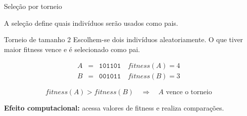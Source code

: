 \documentclass[aspectratio=169,11pt]{beamer}
\newcommand{\bits}[1]{\texttt{#1}}
\begin{document}
\begin{frame}{Seleção por torneio}

    \vspace{0.10cm}

    A seleção define quais indivíduos serão usados como pais.

    \vspace{0.20cm}

    \begin{questionbox}{Torneio de tamanho 2}
        Escolhem-se dois indivíduos aleatoriamente. O que tiver maior fitness
        vence e é selecionado como pai.
    \end{questionbox}

    \vspace{0.25cm}

    \[
        \begin{array}{rcl}
        A &=& \bits{101101} \quad fitness(A)=4 \\
        B &=& \bits{001011} \quad fitness(B)=3
        \end{array}
    \]

    \vspace{0.10cm}

    \[
        fitness(A) > fitness(B) \quad \Rightarrow \quad A \text{ vence o torneio}
    \]

    \vspace{0.08cm}

    \textbf{Efeito computacional:}
    acessa valores de fitness e realiza comparações.

\end{frame}

\end{document}
